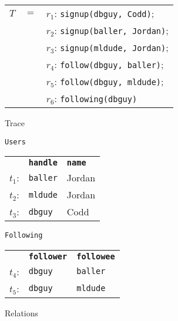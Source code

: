 \begin{figure*}[ht]
  \centering
  \begin{subfigure}[c]{0.3\textwidth}
    \small
    \centering
    \begin{tabular}{rcl}
      $T$  & $=$ & $r_1$: \texttt{signup(dbguy, Codd)}; \\
           &     & $r_2$: \texttt{signup(baller, Jordan)}; \\
           &     & $r_3$: \texttt{signup(mldude, Jordan)}; \\
           &     & $r_4$: \texttt{follow(dbguy, baller)}; \\
           &     & $r_5$: \texttt{follow(dbguy, mldude)}; \\
           &     & $r_6$: \texttt{following(dbguy)} \\
    \end{tabular}
    \caption{Trace}
  \end{subfigure}%
  \begin{subfigure}[c]{0.2\textwidth}
    \centering
    \small

    \texttt{Users} \\
    \begin{tabular}{l|l|l|}
      \cline{2-3}
      & \cellcolor{flatgray!30} \textbf{\texttt{handle}}
      & \cellcolor{flatgray!30} \textbf{\texttt{name}} \\\cline{2-3}
      $t_1$: & \texttt{baller} & Jordan \\
      $t_2$: & \texttt{mldude} & Jordan \\
      $t_3$: & \texttt{dbguy}  & Codd \\\cline{2-3}
    \end{tabular}

    \vspace{3mm}

    \texttt{Following} \\
    \begin{tabular}{l|l|l|}
      \cline{2-3}
      & \cellcolor{flatgray!30} \textbf{\texttt{follower}}
      & \cellcolor{flatgray!30} \textbf{\texttt{followee}} \\\cline{2-3}
      $t_4$: & \texttt{dbguy}    & \texttt{baller} \\
      $t_5$: & \texttt{dbguy}    & \texttt{mldude} \\\cline{2-3}
    \end{tabular}
    \caption{Relations}
  \end{subfigure}%
  \begin{subfigure}[c]{0.5\textwidth}
    \small
    \centering


\end{subfigure}
\end{figure*}
